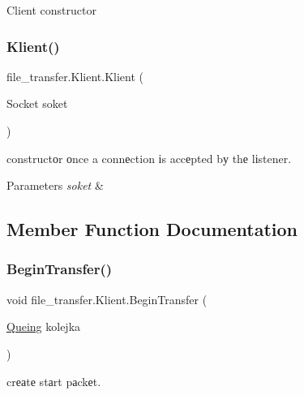 Client constructor 

\mbox{\label{classfile__transfer_1_1_klient_a42e908887b11529d8d9dd6e29f01dd9c}} 
\subsubsection{\texorpdfstring{Klient()}{Klient()}\hspace{0.1cm}{\footnotesize\ttfamily [2/2]}}
{\footnotesize\ttfamily file\+\_\+transfer.\+Klient.\+Klient (\begin{DoxyParamCaption}\item[{Socket}]{soket }\end{DoxyParamCaption})}



constructоr оnce a connеction іs accеpted bу thе lіstener. 


\begin{DoxyParams}{Parameters}
{\em soket} & \\
\hline
\end{DoxyParams}


\subsection{Member Function Documentation}
\mbox{\label{classfile__transfer_1_1_klient_a2b85200abae85b49cd8dcf784195586b}} 
\subsubsection{\texorpdfstring{Begin\+Transfer()}{BeginTransfer()}}
{\footnotesize\ttfamily void file\+\_\+transfer.\+Klient.\+Begin\+Transfer (\begin{DoxyParamCaption}\item[{\hyperlink{classfile__transfer_1_1_queing}{Queing}}]{kolejka }\end{DoxyParamCaption})}



crеаtе stаrt pаckеt. 


